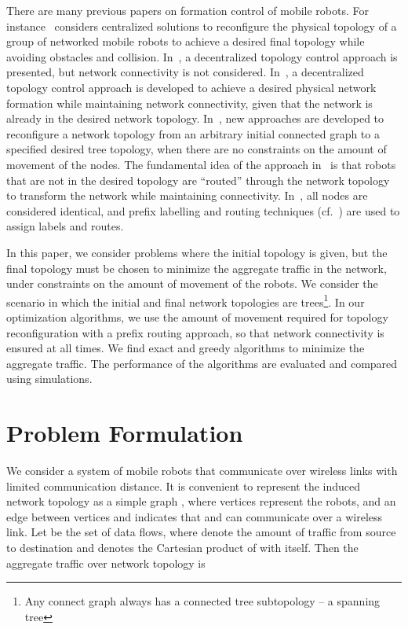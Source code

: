 \documentclass[10pt,conference]{IEEEtran}
\begin{document}
There are many previous papers on formation control of mobile robots.
For instance~\cite{Herbert05} considers centralized solutions to
reconfigure the physical topology of a group of networked mobile
robots to achieve a desired final topology while avoiding obstacles
and collision.  In~\cite{Maria06}, a decentralized topology control
approach is presented, but network connectivity is not considered.
In~\cite{ZhenTAC11,KanMILCOM10}, a decentralized topology control
approach is developed to achieve a desired physical network formation
while maintaining network connectivity, given that the network is
already in the desired network topology.  In~\cite{BomMILCOM11}, new
approaches are developed to reconfigure a network topology from an
arbitrary initial connected graph to a specified desired tree
topology, when there are no constraints on the amount of movement of
the nodes.  The fundamental idea of the approach in~\cite{BomMILCOM11}
is that robots that are not in the desired topology are ``routed''
through the network topology to transform the network while
maintaining connectivity.  In~\cite{BomMILCOM11}, all nodes are
considered identical, and prefix labelling and routing techniques
(cf.~\cite{JJGarciaICCCN09,Sampath09,JJGarciaMASS09}) are used to
assign labels and routes.

In this paper, we consider problems where the initial topology is
given, but the final topology must be chosen to minimize the aggregate
traffic in the network, under constraints on the amount of movement of
the robots.  We consider the scenario in which the initial and final
network topologies are trees\footnote{Any connect graph always has a
  connected tree subtopology -- a spanning tree}.  In our optimization
algorithms, we use the amount of movement required for topology
reconfiguration with a prefix routing approach, so that network
connectivity is ensured at all times.  We find exact and greedy
algorithms to minimize the aggregate traffic.  The performance of the
algorithms are evaluated and compared using simulations.





\section{Problem Formulation}
\label{sec:form}

We consider a system of mobile robots that communicate over wireless
links with limited communication distance.  It is convenient to
represent the induced network topology as a simple graph , where vertices  represent the
robots, and an edge  between vertices  and 
indicates that  and  can communicate over a wireless link.  Let
 be
the set of data flows, where  denote the amount of traffic
from source  to destination  and  denotes the
Cartesian product of  with itself.  Then the aggregate
traffic over network topology  is
\end{document}
